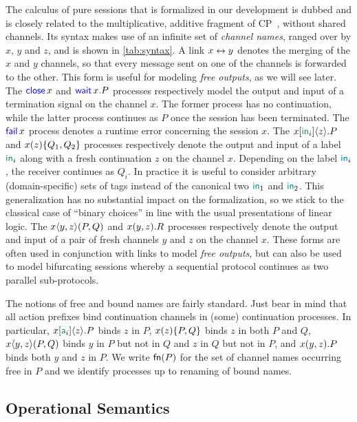 The calculus of pure sessions that is formalized in our development is dubbed
\Calculus and is closely related to the multiplicative, additive fragment of
CP~\citep{Wadler14}, without shared channels. Its syntax makes use of an
infinite set of \emph{channel names}, ranged over by $x$, $y$ and $z$, and is
shown in \cref{tab:syntax}.
%
A link $x\leftrightarrow y$ denotes the merging of the $x$ and $y$ channels, so that
every message sent on one of the channels is forwarded to the other. This form
is useful for modeling \emph{free outputs}, as we will see later.
%
The $\mathsf{\color{blue}close}\,x$ and $\mathsf{\color{blue}wait}\,x.P$ processes respectively model the output and input
of a termination signal on the channel $x$. The former process has no
continuation, while the latter process continues as $P$ once the session has
been terminated.
%
The $\mathsf{\color{blue}fail}\,x$ process denotes a runtime error concerning the session $x$.
%
The $\Select\x{\InTag_i}\z.P$ and $\Case\x\z{Q_1}{Q_2}$ processes respectively
denote the output and input of a label $\mathsf{\color{teal}in}_i$ along with a fresh
continuation $z$ on the channel $x$. Depending on the label $\mathsf{\color{teal}in}_i$, the
receiver continues as $Q_i$. In practice it is useful to consider arbitrary
(domain-specific) sets of tags instead of the canonical two $\mathsf{\color{teal}in}_1$ and
$\mathsf{\color{teal}in}_2$. This generalization has no substantial impact on the formalization,
so we stick to the classical case of ``binary choices'' in line with the usual
presentations of linear logic.
%
The $\Fork\x\y\z{P}{Q}$ and $\Join\x\y\z.R$ processes respectively denote the
output and input of a pair of fresh channels $y$ and $z$ on the channel $x$.
These forms are often used in conjunction with links to model \emph{free
outputs}, but can also be used to model bifurcating sessions whereby a
sequential protocol continues as two parallel sub-protocols.

The notions of free and bound names are fairly standard. Just bear in mind that
all action prefixes bind continuation channels in (some) continuation processes.
In particular, $\Select\x{\Tag_i}\z.P$ binds $z$ in $P$, $\Case\x\z{P}{Q}$ binds
$z$ in both $P$ and $Q$, $\Fork\x\y\z{P}{Q}$ binds $y$ in $P$ but not in $Q$ and
$z$ in $Q$ but not in $P$, and $\Join\x\y\z.P$ binds both $y$ and $z$ in $P$.
%
We write $\mathsf{fn}(P)$ for the set of channel names occurring free in $P$ and we
identify processes up to renaming of bound names.

\subsection{Operational Semantics}
\label{sec:semantics}

